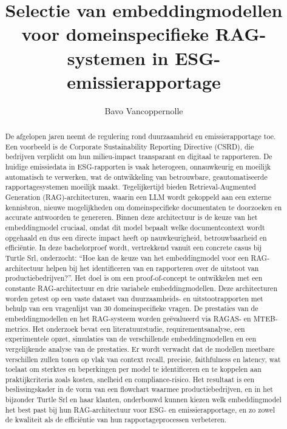 \documentclass{hogent-article}
\title{Selectie van embeddingmodellen voor domeinspecifieke RAG-systemen in ESG-emissierapportage}
\author{Bavo Vancoppernolle}
\begin{document}
\begin{abstract}
  De afgelopen jaren neemt de regulering rond duurzaamheid en emissierapportage toe. Een voorbeeld is de Corporate Sustainability Reporting Directive (CSRD), die bedrijven verplicht om hun milieu-impact transparant en digitaal te rapporteren. De huidige emissiedata in ESG-rapporten is vaak heterogeen, onnauwkeurig en moeilijk automatisch te verwerken, wat de ontwikkeling van betrouwbare, geautomatiseerde rapportagesystemen moeilijk maakt. Tegelijkertijd bieden Retrieval-Augmented Generation (RAG)-architecturen, waarin een LLM wordt gekoppeld aan een externe kennisbron, nieuwe mogelijkheden om domeinspecifieke documentaten te doorzoeken en accurate antwoorden te genereren. Binnen deze architectuur is de keuze van het embeddingmodel cruciaal, omdat dit model bepaalt welke documentcontext wordt opgehaald en dus een directe impact heeft op nauwkeurigheid, betrouwbaarheid en efficiëntie. In deze bachelorproef wordt, vertrekkend vanuit een concrete casus bij Turtle Srl, onderzocht: ``Hoe kan de keuze van het embeddingmodel voor een RAG-architectuur helpen bij het identificeren van en rapporteren over de uitstoot van productiebedrijven?''. Het doel is om een proof-of-concept te ontwikkelen met een constante RAG-architectuur en drie variabele embeddingmodellen. Deze architecturen worden getest op een vaste dataset van duurzaamheids- en uitstootrapporten met behulp van een vragenlijst van 30 domeinspecifieke vragen. De prestaties van de embeddingmodellen en het RAG-systeem worden geëvalueerd via RAGAS- en MTEB-metrics. Het onderzoek bevat een literatuurstudie, requirementsanalyse, een experimentele opzet, simulaties van de verschillende embeddingmodellen en een vergelijkende analyse van de prestaties. Er wordt verwacht dat de modellen meetbare verschillen zullen tonen op vlak van context recall, precisie, faithfulness en latency, wat toelaat om sterktes en beperkingen per model te identificeren en te koppelen aan praktijkcriteria zoals kosten, snelheid en compliance-risico. Het resultaat is een beslissingskader in de vorm van een flowchart waarmee productiebedrijven, en in het bijzonder Turtle Srl en haar klanten, onderbouwd kunnen kiezen welk embeddingmodel het best past bij hun RAG-architectuur voor ESG- en emissierapportage, en zo zowel de kwaliteit als de efficiëntie van hun rapportageprocessen verbeteren.
\end{abstract}

\tableofcontents

\listoffigures



\printbibliography[heading=bibintoc]
\end{document}
